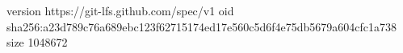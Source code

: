 version https://git-lfs.github.com/spec/v1
oid sha256:a23d789c76a689ebc123f62715174ed17e560c5d6f4e75db5679a604cfc1a738
size 1048672
